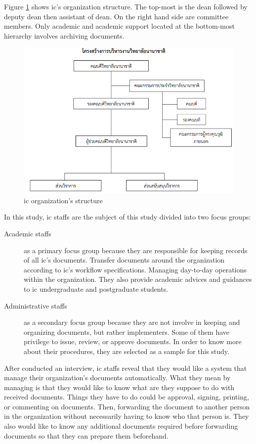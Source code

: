Figure \ref{ic-org-sturcture} shows \gls{ic}'s organization structure.
The top-most is the dean followed by deputy dean then assistant of dean.
On the right hand side are committee members.
Only academic and academic support located at the bottom-most hierarchy involves archiving documents.
 \begin{figure}[h]
 	\centering
 	\caption{\gls{ic} organization's structure}
 	\label{ic-org-sturcture}
 	\includegraphics[scale=0.7]{res/Methodology/ic-org}
 \end{figure}

In this study, \gls{ic} staffs are the subject of this study divided into two focus groups:
\begin{description}
	\item [Academic staffs] as a primary focus group because they are responsible for keeping records of all \gls{ic}'s documents.
	Transfer documents around the organization according to \gls{ic}'s workflow specifications.
	Managing day-to-day operations within the organization.
	They also provide academic advices and guidances to \gls{ic} undergraduate and postgraduate students.
	\item [Administrative staffs] as a secondary focus group because they are not involve in keeping and organizing documents, but rather implementers.
	Some of them have privilege to issue, review, or approve documents.
	In order to know more about their procedures, they are selected as a sample for this study.
\end{description}

After conducted an interview, \gls{ic} staffs reveal that they would like a system that manage their organization's documents automatically.
What they mean by managing is that they would like to know what are they suppose to do with received documents.
Things they have to do could be approval, signing, printing, or commenting on documents.
Then, forwarding the document to another person in the organization without necessarily having to know who that person is.
They also would like to know any additional documents required before forwarding documents so that they can prepare them beforehand.

